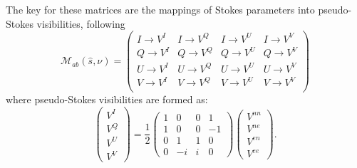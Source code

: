 \documentclass[twocolumn, trackchanges]{aastex61}
\begin{document}
The key for these matrices are the mappings of Stokes parameters into pseudo-Stokes visibilities, following
\begin{equation}
\mathcal{M}_{ab}(\hat{s},\nu) =
\begin{pmatrix}
I \rightarrow V^I & I \rightarrow V^Q & I \rightarrow V^U & I \rightarrow V^V\\
Q \rightarrow V^I  & Q \rightarrow V^Q & Q \rightarrow V^U & Q \rightarrow V^V\\
U \rightarrow V^I  & U \rightarrow V^Q & U \rightarrow V^U & U \rightarrow V^V\\
V \rightarrow V^I  & V \rightarrow V^Q & V \rightarrow V^U & V \rightarrow V^V\\
\end{pmatrix}
\label{eq:Mab}
\end{equation}
where pseudo-Stokes visibilities are formed as:
\begin{equation}
\left(\begin{array}{c}
V^{I}\\
V^{Q}\\
V^{U}\\
V^{V}\end{array} \right)
= \frac{1}{2}
\left( \begin{array}{cccc}
1 & 0 & 0 & 1 \\
1 & 0 & 0 & -1 \\
0 & 1 & 1 & 0 \\
0 & -i & i & 0 \end{array} \right) 
\left(\begin{array}{c}
V^{nn}\\
V^{ne}\\
V^{en}\\
V^{ee}\end{array} \right) .
\label{eq:pseudo-stokes}
\end{equation}
\end{document}
